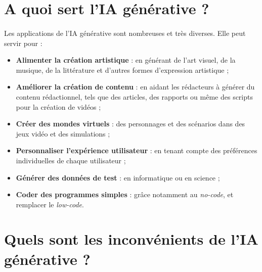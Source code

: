 \section{A quoi sert l'IA générative ?}
\paragraph{}
Les applications de l'IA générative sont nombreuses et très diverses. Elle peut
servir pour :

\begin{itemize}[label=--]
	\item \textbf{Alimenter la création artistique} : en générant de l'art visuel,
		de la musique, de la littérature et d'autres formes d'expression artistique
		;

	\item \textbf{Améliorer la création de contenu} : en aidant les rédacteurs à
		générer du contenu rédactionnel, tels que des articles, des rapports ou même
		des scripts pour la création de vidéos ;

	\item \textbf{Créer des mondes virtuels} : des personnages et des scénarios
		dans des jeux vidéo et des simulations ;

	\item \textbf{Personnaliser l'expérience utilisateur} : en tenant compte des
		préférences individuelles de chaque utilisateur ;

	\item \textbf{Générer des données de test} : en informatique ou en science ;

	\item \textbf{Coder des programmes simples} : grâce notamment au \textit{no-code},
		et remplacer le \textit{low-code}.
\end{itemize}
\section{Quels sont les inconvénients de l’IA générative ?}
